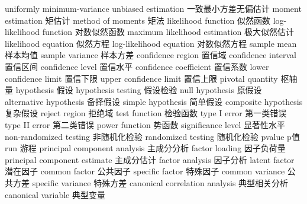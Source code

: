 {uniformly minimum-variance unbiased estimation} 
{一致最小方差无偏估计}
{moment estimation} 
{矩估计}
{method of moments} 
{矩法}
{likelihood function} 
{似然函数}
{log-likelihood function} 
{对数似然函数}
{maximum likelihood estimation} 
{极大似然估计}
{likelihood equation} 
{似然方程}
{log-likelihood equation} 
{对数似然方程}
{sample mean} 
{样本均值}
{sample variance} 
{样本方差}
{confidence region} 
{置信域}
{confidence interval} 
{置信区间}
{confidence level} 
{置信水平}
{confidence coefficient} 
{置信系数}
{lower confidence limit} 
{置信下限}
{upper confidence limit} 
{置信上限}
{pivotal quantity} 
{枢轴量}
{hypothesis} 
{假设}
{hypothesis testing} 
{假设检验}
{null hypothesis} 
{原假设}
{alternative hypothesis} 
{备择假设}
{simple hypothesis} 
{简单假设}
{composite hypothesis} 
{复杂假设}
{reject region} 
{拒绝域}
{test function} 
{检验函数}
{type I error} 
{第一类错误}
{type II error} 
{第二类错误}
{power function} 
{势函数}
{significance level} 
{显著性水平}
{non-randomized testing} 
{非随机化检验}
{randomized testing} 
{随机化检验}
{pvalue} 
{p值}
{run} 
{游程}
{principal component analysis} 
{主成分分析}
{factor loading} 
{因子负荷量}
{principal component estimate} 
{主成分估计}
{factor analysis} 
{因子分析}
{latent factor} 
{潜在因子}
{common factor} 
{公共因子}
{specific factor} 
{特殊因子}
{common variance} 
{公共方差}
{specific variance} 
{特殊方差}
{canonical correlation analysis} 
{典型相关分析}
{canonical variable} 
{典型变量}

